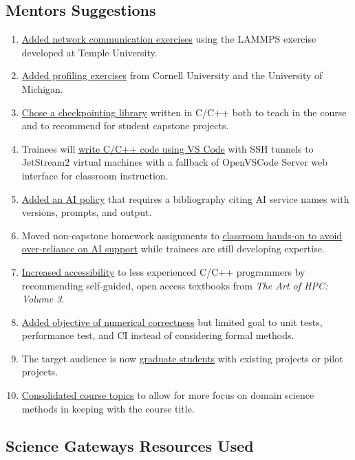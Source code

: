 \documentclass{article}
\newcommand{\sectionbox}[1]{%
  \begin{tcolorbox}[sharp corners,boxrule=0pt,top=15pt,colback=fh-blue,coltext=fh-gold]%
    \section*{#1\vphantom{Yy}}%
  \end{tcolorbox}%
}
\begin{document}
\begin{multicols}{2}
  \sectionbox{Mentors Suggestions}%
  \begin{multicols}{2}
    \begin{enumerate}
    \item \ul{Added network communication exercises} %
      using the LAMMPS exercise developed at Temple University.
    \item \ul{Added profiling exercises} %
      from Cornell University %
      and the University of Michigan.
    \item \ul{Chose a checkpointing library} %
      written in C/C++ %
      both to teach in the course %
      and to recommend for student capstone projects.
    \item Trainees will \ul{write C/C++ code using VS Code} %
      with SSH tunnels to JetStream2 virtual machines %
      with a fallback of OpenVSCode Server web interface %
      for classroom instruction.
    \item \ul{Added an AI policy} %
      that requires a bibliography %
      citing AI service names with versions, prompts, and output.
    \item Moved non-capstone homework assignments to %
      \ul{classroom hands-on to avoid over-reliance on AI support} %
      while trainees are still developing expertise.
    \item \ul{Increased accessibility} %
      to less experienced C/C++ programmers %
      by recommending self-guided, open access textbooks %
      from \emph{The Art of HPC: Volume 3}.
    \item \ul{Added objective of numerical correctness} %
      but limited goal to unit tests, performance test, and CI %
      instead of considering formal methods.
    \item The target audience is now \ul{graduate students} %
      with existing projects or pilot projects.
    \item \ul{Consolidated course topics} %
      to allow for more focus on domain science methods %
      in keeping with the course title.
    \end{enumerate}
  \end{multicols}

  \sectionbox{Science Gateways Resources Used}%
\end{multicols}
\end{document}
